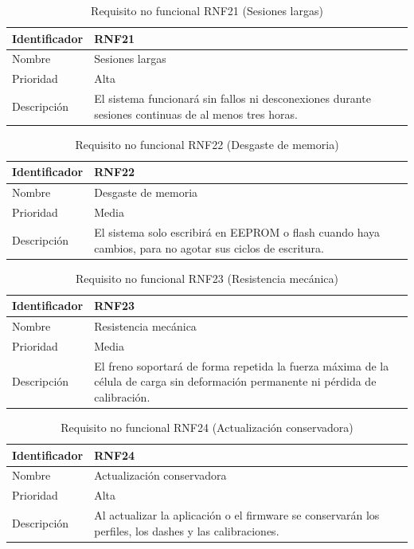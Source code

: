\begin{table}[H]
	\centering
	\renewcommand{\arraystretch}{2}
	\begin{tabular}{|l|p{10cm}|}
		\hline
		Identificador & RNF21 \\
		\hline
		Nombre & Sesiones largas \\
		\hline
		Prioridad & Alta \\
		\hline
		Descripción & El sistema funcionará sin fallos ni desconexiones durante sesiones continuas de al menos tres horas. \\
		\hline
	\end{tabular}
	\caption{Requisito no funcional RNF21 (Sesiones largas)}
	\label{tab:rnf21}
\end{table}

\begin{table}[H]
	\centering
	\renewcommand{\arraystretch}{2}
	\begin{tabular}{|l|p{10cm}|}
		\hline
		Identificador & RNF22 \\
		\hline
		Nombre & Desgaste de memoria \\
		\hline
		Prioridad & Media \\
		\hline
		Descripción & El sistema solo escribirá en EEPROM o flash cuando haya cambios, para no agotar sus ciclos de escritura. \\
		\hline
	\end{tabular}
	\caption{Requisito no funcional RNF22 (Desgaste de memoria)}
	\label{tab:rnf22}
\end{table}

\begin{table}[H]
	\centering
	\renewcommand{\arraystretch}{2}
	\begin{tabular}{|l|p{10cm}|}
		\hline
		Identificador & RNF23 \\
		\hline
		Nombre & Resistencia mecánica \\
		\hline
		Prioridad & Media \\
		\hline
		Descripción & El freno soportará de forma repetida la fuerza máxima de la célula de carga sin deformación permanente ni pérdida de calibración. \\
		\hline
	\end{tabular}
	\caption{Requisito no funcional RNF23 (Resistencia mecánica)}
	\label{tab:rnf23}
\end{table}

\begin{table}[H]
	\centering
	\renewcommand{\arraystretch}{2}
	\begin{tabular}{|l|p{10cm}|}
		\hline
		Identificador & RNF24 \\
		\hline
		Nombre & Actualización conservadora \\
		\hline
		Prioridad & Alta \\
		\hline
		Descripción & Al actualizar la aplicación o el firmware se conservarán los perfiles, los dashes y las calibraciones. \\
		\hline
	\end{tabular}
	\caption{Requisito no funcional RNF24 (Actualización conservadora)}
	\label{tab:rnf24}
\end{table}

